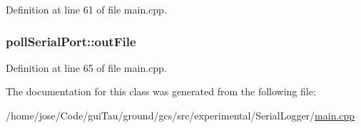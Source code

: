 Definition at line 61 of file main.\-cpp.

\hypertarget{classpoll_serial_port_a23012b7e6b01a832c94542dcae352236}{
\subsubsection[{out\-File}]{ poll\-Serial\-Port\-::out\-File\hspace{0.3cm}{\ttfamily [protected]}}}\label{classpoll_serial_port_a23012b7e6b01a832c94542dcae352236}


Definition at line 65 of file main.\-cpp.



The documentation for this class was generated from the following file\-:\begin{DoxyCompactItemize}
\item 
/home/jose/\-Code/gui\-Tau/ground/gcs/src/experimental/\-Serial\-Logger/\hyperlink{gcs_2src_2experimental_2_serial_logger_2main_8cpp}{main.\-cpp}\end{DoxyCompactItemize}

